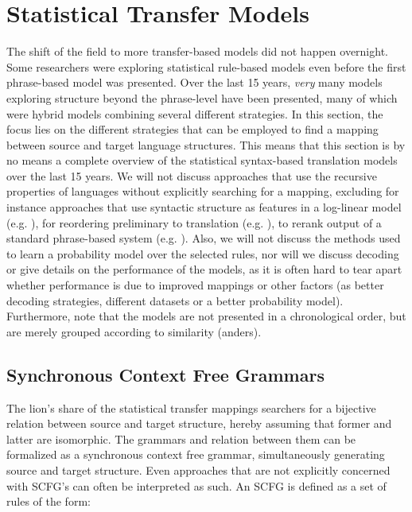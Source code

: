 \documentclass{report}
\theoremstyle{definition}
\theoremstyle{plain}
\begin{document}
\section{Statistical Transfer Models}


The shift of the field to more transfer-based models did not happen overnight. Some researchers were exploring statistical rule-based models even before the first phrase-based model was presented. Over the last 15 years, \textit{very} many models exploring structure beyond the phrase-level have been presented, many of which were hybrid models combining several different strategies. In this section, the focus lies on the different strategies that can be employed to find a mapping between source and target language structures. This means that this section is by no means a complete overview of the statistical syntax-based translation models over the last 15 years. We will not discuss approaches that use the recursive properties of languages without explicitly searching for a mapping, excluding for instance approaches that use syntactic structure as features in a log-linear model (e.g. \cite{cherry2013improved,liu2010semantic}), for reordering preliminary to translation (e.g. \cite{khalilov2012statistical}), to rerank output of a standard phrase-based system (e.g. \cite{och2004smorgasbord}). Also, we will not discuss the methods used to learn a probability model over the selected rules, nor will we discuss decoding or give details on the performance of the models, as it is often hard to tear apart whether performance is due to improved mappings or other factors (as better decoding strategies, different datasets or a better probability model). Furthermore, note that the models are not presented in a chronological order, but are merely grouped according to similarity (anders).

\subsection{Synchronous Context Free Grammars}
The lion's share of the statistical transfer mappings searchers for a bijective relation between source and target structure, hereby assuming that former and latter are isomorphic. The grammars and relation between them can be formalized as a synchronous context free grammar, simultaneously generating source and target structure. Even approaches that are not explicitly concerned with SCFG's can often be interpreted as such. An SCFG is defined as a set of rules of the form:
\end{document}
